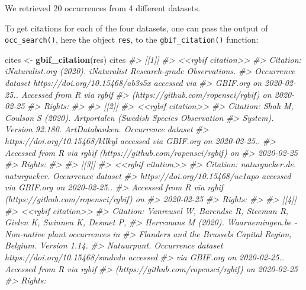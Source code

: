 \documentclass[3p]{elsarticle} %
\newenvironment{Shaded}{\begin{snugshade}}{\end{snugshade}}
\newcommand{\CommentTok}[1]{\textcolor[rgb]{0.56,0.35,0.01}{\textit{#1}}}
\newcommand{\KeywordTok}[1]{\textcolor[rgb]{0.13,0.29,0.53}{\textbf{#1}}}
\newcommand{\NormalTok}[1]{#1}
\newcommand{\StringTok}[1]{\textcolor[rgb]{0.31,0.60,0.02}{#1}}
\begin{document}
We retrieved 20 occurrences from 4 different datasets.

To get citations for each of the four datasets, one can pass the output
of \texttt{occ\_search()}, here the object \texttt{res}, to the
\texttt{gbif\_citation()} function:

\begin{Shaded}
\begin{Highlighting}[]
\NormalTok{cites <{-}}\StringTok{ }\KeywordTok{gbif\_citation}\NormalTok{(res)}
\NormalTok{cites}
\CommentTok{\#> [[1]]}
\CommentTok{\#> <<rgbif citation>>}
\CommentTok{\#>    Citation: iNaturalist.org (2020). iNaturalist Research{-}grade Observations.}
\CommentTok{\#>         Occurrence dataset https://doi.org/10.15468/ab3s5x accessed via}
\CommentTok{\#>         GBIF.org on 2020{-}02{-}25.. Accessed from R via rgbif}
\CommentTok{\#>         (https://github.com/ropensci/rgbif) on 2020{-}02{-}25}
\CommentTok{\#>    Rights:}
\CommentTok{\#> }
\CommentTok{\#> [[2]]}
\CommentTok{\#> <<rgbif citation>>}
\CommentTok{\#>    Citation: Shah M, Coulson S (2020). Artportalen (Swedish Species Observation}
\CommentTok{\#>         System). Version 92.180. ArtDatabanken. Occurrence dataset}
\CommentTok{\#>         https://doi.org/10.15468/kllkyl accessed via GBIF.org on 2020{-}02{-}25..}
\CommentTok{\#>         Accessed from R via rgbif (https://github.com/ropensci/rgbif) on}
\CommentTok{\#>         2020{-}02{-}25}
\CommentTok{\#>    Rights:}
\CommentTok{\#> }
\CommentTok{\#> [[3]]}
\CommentTok{\#> <<rgbif citation>>}
\CommentTok{\#>    Citation: naturgucker.de. naturgucker. Occurrence dataset}
\CommentTok{\#>         https://doi.org/10.15468/uc1apo accessed via GBIF.org on 2020{-}02{-}25..}
\CommentTok{\#>         Accessed from R via rgbif (https://github.com/ropensci/rgbif) on}
\CommentTok{\#>         2020{-}02{-}25}
\CommentTok{\#>    Rights:}
\CommentTok{\#> }
\CommentTok{\#> [[4]]}
\CommentTok{\#> <<rgbif citation>>}
\CommentTok{\#>    Citation: Vanreusel W, Barendse R, Steeman R, Gielen K, Swinnen K, Desmet P,}
\CommentTok{\#>         Herremans M (2020). Waarnemingen.be {-} Non{-}native plant occurrences in}
\CommentTok{\#>         Flanders and the Brussels Capital Region, Belgium. Version 1.14.}
\CommentTok{\#>         Natuurpunt. Occurrence dataset https://doi.org/10.15468/smdvdo accessed}
\CommentTok{\#>         via GBIF.org on 2020{-}02{-}25.. Accessed from R via rgbif}
\CommentTok{\#>         (https://github.com/ropensci/rgbif) on 2020{-}02{-}25}
\CommentTok{\#>    Rights:}
\end{Highlighting}
\end{Shaded}
\end{document}
